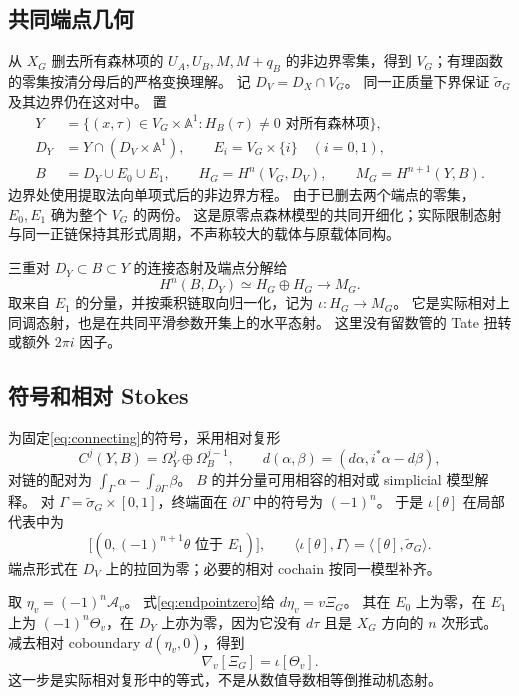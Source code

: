 \documentclass[11pt,a4paper]{ctexart}
\theoremstyle{cnplain}
\theoremstyle{remark}\newtheorem{remark}[theorem]{注}
\begin{document}
\subsection{共同端点几何}
从 $X_G$ 删去所有森林项的 $U_A,U_B,M,M+q_B$ 的非边界零集，得到 $V_G$；有理函数的零集按清分母后的严格变换理解。
记 $D_V=D_X\cap V_G$。
同一正质量下界保证 $\widetilde\sigma_G$ 及其边界仍在这对中。
置
\begin{align}\label{eq:pairs}
 Y&=\{(x,\tau)\in V_G\times\mathbb A^1:
                         H_B(\tau)\ne0\text{ 对所有森林项}\},\nonumber\\
 D_Y&=Y\cap(D_V\times\mathbb A^1),\qquad
 E_i=V_G\times\{i\}\quad(i=0,1),\nonumber\\
 B&=D_Y\cup E_0\cup E_1,\qquad
 H_G=H^n(V_G,D_V),\qquad M_G=H^{n+1}(Y,B).
\end{align}
边界处使用提取法向单项式后的非边界方程。
由于已删去两个端点的零集，$E_0,E_1$ 确为整个 $V_G$ 的两份。
这是原零点森林模型的共同开细化；实际限制态射与同一正链保持其形式周期，不声称较大的载体与原载体同构。

三重对 $D_Y\subset B\subset Y$ 的连接态射及端点分解给
\begin{equation}\label{eq:connecting}
 H^n(B,D_Y)\simeq H_G\oplus H_G
       \longrightarrow M_G.
\end{equation}
取来自 $E_1$ 的分量，并按乘积链取向归一化，记为 $\iota:H_G\to M_G$。
它是实际相对上同调态射，也是在共同平滑参数开集上的水平态射。
这里没有留数管的 Tate 扭转或额外 $2\pi i$ 因子。

\subsection{符号和相对 Stokes}
为固定\eqref{eq:connecting}的符号，采用相对复形
\[
 C^j(Y,B)=\Omega_Y^j\oplus\Omega_B^{j-1},\qquad
 d(\alpha,\beta)=(d\alpha,i^*\alpha-d\beta),
\]
对链的配对为 $\int_\Gamma\alpha-\int_{\partial\Gamma}\beta$。
$B$ 的并分量可用相容的相对或 simplicial 模型解释。
对 $\Gamma=\widetilde\sigma_G\times[0,1]$，终端面在 $\partial\Gamma$ 中的符号为 $(-1)^n$。
于是 $\iota[\theta]$ 在局部代表中为
\begin{equation}\label{eq:cone}
 \bigl[(0,(-1)^{n+1}\theta\text{ 位于 }E_1)\bigr],
 \qquad
 \langle\iota[\theta],\Gamma\rangle
     =\langle[\theta],\widetilde\sigma_G\rangle.
\end{equation}
端点形式在 $D_V$ 上的拉回为零；必要的相对 cochain 按同一模型补齐。

取 $\eta_v=(-1)^n\mathcal A_v$。
式\eqref{eq:endpointzero}给 $d\eta_v=v\Xi_G$。
其在 $E_0$ 上为零，在 $E_1$ 上为 $(-1)^n\Theta_v$，在 $D_Y$ 上亦为零，因为它没有 $d\tau$ 且是 $X_G$ 方向的 $n$ 次形式。
减去相对 coboundary $d(\eta_v,0)$，得到
\begin{equation}\label{eq:GM}
 \nabla_v[\Xi_G]=\iota[\Theta_v].
\end{equation}
这一步是实际相对复形中的等式，不是从数值导数相等倒推动机态射。
\end{document}
